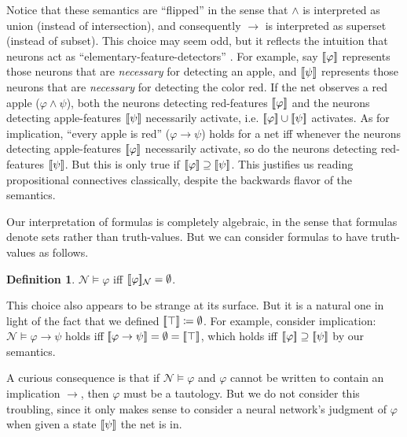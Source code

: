 \documentclass[letterpaper]{article}
\theoremstyle{definition}
\newtheorem{definition}{Definition}
\newcommand{\semantics}[1]{[\![\mbox{\em $ #1 $\/}]\!]}
\newcommand{\Net}{\mathcal{N}}
\begin{document}
Notice that these semantics are ``flipped'' in the sense that $\land$ is interpreted as union (instead of intersection), and consequently $\to$ is interpreted as superset (instead of subset).  This choice may seem odd, but it  reflects the intuition that neurons act as ``elementary-feature-detectors'' \citep{leitgeb2001nonmonotonic}.  
For example, say $\semantics{\varphi}$ represents those neurons that are \textit{necessary} for detecting an apple, and $\semantics{\psi}$ represents those neurons that are \textit{necessary} for detecting the color red. 
If the net observes a red apple ($\varphi \land \psi$), both the neurons detecting red-features $\semantics{\varphi}$ and the neurons detecting apple-features $\semantics{\psi}$ necessarily activate, i.e. $\semantics{\varphi} \cup \semantics{\psi}$ activates.  As for implication, ``every apple is red'' (${\varphi \to \psi}$) holds for a net iff whenever the neurons detecting apple-features $\semantics{\varphi}$ necessarily activate, so do the neurons detecting red-features $\semantics{\psi}$.  But this is only true if ${\semantics{\varphi} \supseteq \semantics{\psi}}$.  This justifies us reading propositional connectives classically, despite the backwards flavor of the semantics.


Our interpretation of formulas is completely algebraic, in the sense that formulas denote sets rather than truth-values.  But we can consider formulas to have truth-values as follows.

\begin{definition}
$\Net \models \varphi$ iff $\semantics{\varphi}_\Net = \emptyset$.
\end{definition}

This choice also appears to be strange at its surface.  But it is a natural one in light of the fact that we defined $\semantics{\top} \coloneqq \emptyset$.  For example, consider implication: $\Net \models \varphi \to \psi$ holds iff $\semantics{\varphi \to \psi} = \emptyset = \semantics{\top}$, which holds iff $\semantics{\varphi} \supseteq \semantics{\psi}$ by our semantics.

A curious consequence is that if $\Net \models \varphi$ and $\varphi$ cannot be written to contain an implication $\to$, then $\varphi$ must be a tautology.  But we do not consider this troubling, since it only makes sense to consider a neural network's judgment of $\varphi$ when given a state $\semantics{\psi}$ the net is in.
\end{document}
